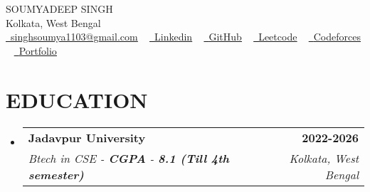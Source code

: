\documentclass[letterpaper,11pt]{article}
\makeatletter
\newcommand{\resumeSubheading}[4]{
  \vspace{-2pt}\item
    \begin{tabular*}{1.0\textwidth}[t]{l@{\extracolsep{\fill}}r}
      \textbf{\large#1} & \textbf{\small #2} \\
      \textit{\large#3} & \textit{\small #4} \\
      
    \end{tabular*}\vspace{-7pt}
}
\newcommand{\resumeSubHeadingListStart}{\begin{itemize}[leftmargin=0.0in, label={}]}
\newcommand{\resumeSubHeadingListEnd}{\end{itemize}}
\makeatother
\begin{document}




\begin{center}
    {\Huge \scshape SOUMYADEEP SINGH} \\ \vspace{1pt}
    Kolkata, West Bengal \\ \vspace{1pt}
    \small \href{mailto:singhsoumya1103@gmail.com}{\raisebox{-0.2\height}\faEnvelope\  \underline{singhsoumya1103@gmail.com}} ~ 
    \href{https://linkedin.com/in/soumyadeep-singh-347044258}{\raisebox{-0.2\height}\faLinkedinSquare\ \underline{Linkedin}}  ~
    \href{https://github.com/singhsoumya0109}{\raisebox{-0.2\height}\faGithub\ \underline{GitHub}} ~
    \href{https://leetcode.com/u/Soumyadeep_Singh2004/}{\raisebox{-0.2\height}\faLeetcode\ \underline{Leetcode}} ~
    \href{https://codeforces.com/profile/singhsoumya_coder}{\raisebox{-0.2\height}\faPoll\ \underline{Codeforces}} ~
    \href{https://singhsoumya0109.github.io/Portfolio-website/}{\raisebox{-0.2\height}\faGlobe\ \underline{Portfolio}}
    \vspace{-8pt}
\end{center}


\section{EDUCATION}
  \resumeSubHeadingListStart
    \resumeSubheading
      {Jadavpur University}{2022-2026}
      {Btech in CSE - \textbf{CGPA} - \textbf{8.1  (Till 4th semester)}}{Kolkata, West Bengal}
  \resumeSubHeadingListEnd
  
\end{document}
